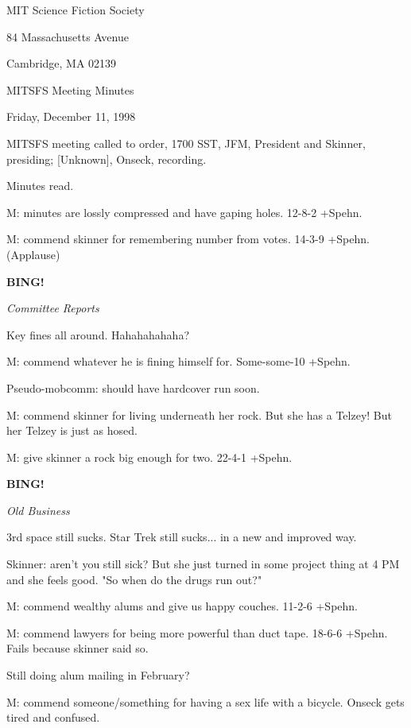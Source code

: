 \documentclass[12pt]{article}
\newcommand{\bing}{{\bf BING!} }
\newcommand{\goto}[1]{\bing \vskip 12pt \centerline{{\em{#1}}}}
\begin{document}
\begin{center}

MIT Science Fiction Society 

84 Massachusetts Avenue

Cambridge, MA 02139

\vspace{12pt}

MITSFS Meeting Minutes 

Friday, December 11, 1998

\end{center}
 
\vspace{18pt}

\setlength{\parskip}{6pt}

\noindent
MITSFS meeting called to order, 1700 SST,
JFM, President and Skinner, presiding; [Unknown], Onseck, recording.

Minutes read.

M: minutes are lossly compressed and have gaping holes. 12-8-2 +Spehn.

M: commend skinner for remembering number from votes. 14-3-9 +Spehn. (Applause)

\goto{Committee Reports}

Key fines all around. Hahahahahaha?

M: commend whatever he is fining himself for. Some-some-10 +Spehn.

Pseudo-mobcomm: should have hardcover run soon.

M: commend skinner for living underneath her rock. But she has a Telzey! But her Telzey is just as hosed.

M: give skinner a rock big enough for two. 22-4-1 +Spehn.

\goto{Old Business}

3rd space still sucks. Star Trek still sucks... in a new and improved way.

Skinner: aren't you still sick? But she just turned in some project thing at 4 PM and she feels good. "So when do the drugs run out?"

M: commend wealthy alums and give us happy couches. 11-2-6 +Spehn.

M: commend lawyers for being more powerful than duct tape. 18-6-6 +Spehn. Fails because skinner said so.

Still doing alum mailing in February?

M: commend someone/something for having a sex life with a bicycle. Onseck gets tired and confused.
\end{document}
